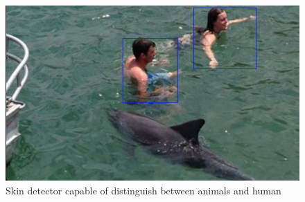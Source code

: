 \begin{figure}[H]
    \centering
        \includegraphics[scale=0.7]{Images/humanDolphin.png}
    \caption{Skin detector capable of distinguish between animals and human}
    \label{fig:humanAndDolphin}
\end{figure}


